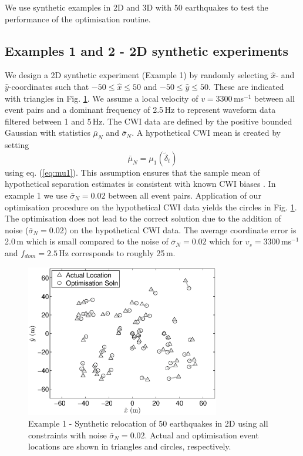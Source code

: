 \documentclass[extra]{gji}
\begin{document}
We use synthetic examples in 2D and 3D with 50 earthquakes to test
the performance of the optimisation routine.

\subsection{Examples 1 and 2 - 2D synthetic experiments}

We design a 2D synthetic experiment (Example 1) by
randomly selecting $\hat{x}$- and $\hat{y}$-coordinates such that $-50 \leq \hat{x} \leq 50$ and $-50 \leq \hat{y} \leq 50$.
These are indicated with triangles in Fig. \ref{fig-2D50eq-relocation_eg1}.
 We assume a local velocity of $v=3300\,$ms$^{-1}$ between all
event pairs and a dominant frequency of 2.5$\,$Hz to represent waveform data filtered between 1 and 5$\,$Hz.
The CWI data are defined by the positive bounded Gaussian with statistics
$\bar{\mu}_N$ and $\bar{\sigma}_N$. A hypothetical CWI mean is created by setting
\begin{equation}
\label{eq:hypothetical-CWI-mean-optichapt}
\bar{\mu}_N = \mu_1 \left( \widetilde{\delta}_t \right)
\end{equation}
using eq. (\ref{eq:mu1}). This assumption ensures that the sample
mean of hypothetical separation estimates is consistent with known
CWI biases \citep{dr_Robinson11a}. In example 1 we use
$\bar{\sigma}_N=0.02$ between all event pairs. Application of our
optimisation procedure on the hypothetical CWI data yields the
circles in Fig. \ref{fig-2D50eq-relocation_eg1}. The optimisation
does not lead to the correct solution due to the addition of noise
($\bar{\sigma}_N=0.02$) on the hypothetical CWI data. The average
coordinate error is 2.0\,m which is small compared to the noise of
$\bar{\sigma}_N=0.02$ which for $v_s=3300$\,ms$^{-1}$ and
$f_{dom}=2.5$\,Hz corresponds to roughly 25\,m.
\begin{figure}
\includegraphics[width = 20pc]{diags/locs_2D_50eq_1.eps}
\caption{Example 1 - Synthetic relocation of 50 earthquakes in 2D
using all constraints with noise $\bar{\sigma}_N=0.02$. Actual and
optimisation event locations are shown in triangles and circles,
respectively.} \label{fig-2D50eq-relocation_eg1}
\end{figure}
\end{document}
